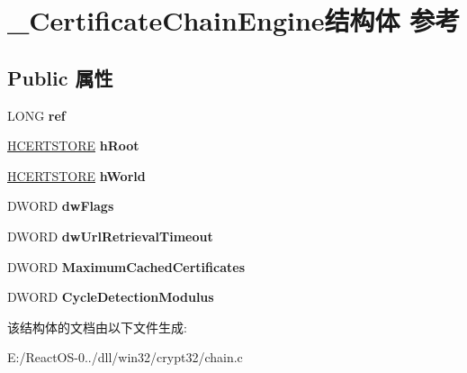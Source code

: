 \hypertarget{struct___certificate_chain_engine}{}\section{\+\_\+\+Certificate\+Chain\+Engine结构体 参考}
\label{struct___certificate_chain_engine}
\subsection*{Public 属性}
\begin{DoxyCompactItemize}
\item 
\mbox{\label{struct___certificate_chain_engine_a5aac372abbe3a2ff8d47ec9254497d0a}} 
L\+O\+NG {\bfseries ref}
\item 
\mbox{\label{struct___certificate_chain_engine_a8f500d47dfae910d3ceca909ca881e74}} 
\hyperlink{interfacevoid}{H\+C\+E\+R\+T\+S\+T\+O\+RE} {\bfseries h\+Root}
\item 
\mbox{\label{struct___certificate_chain_engine_ae693638b326feb839b59491d18c00610}} 
\hyperlink{interfacevoid}{H\+C\+E\+R\+T\+S\+T\+O\+RE} {\bfseries h\+World}
\item 
\mbox{\label{struct___certificate_chain_engine_ad490368db7488c5a9e504ca898573c4b}} 
D\+W\+O\+RD {\bfseries dw\+Flags}
\item 
\mbox{\label{struct___certificate_chain_engine_a68c69f6d65ffd529b7999c38ca8dd7a4}} 
D\+W\+O\+RD {\bfseries dw\+Url\+Retrieval\+Timeout}
\item 
\mbox{\label{struct___certificate_chain_engine_a0f00071e72bd29bb7357a64000fb1fff}} 
D\+W\+O\+RD {\bfseries Maximum\+Cached\+Certificates}
\item 
\mbox{\label{struct___certificate_chain_engine_ab4abfdc11283a298c8c30e38f1119502}} 
D\+W\+O\+RD {\bfseries Cycle\+Detection\+Modulus}
\end{DoxyCompactItemize}


该结构体的文档由以下文件生成\+:\begin{DoxyCompactItemize}
\item 
E\+:/\+React\+O\+S-\/0../dll/win32/crypt32/chain.\+c\end{DoxyCompactItemize}
